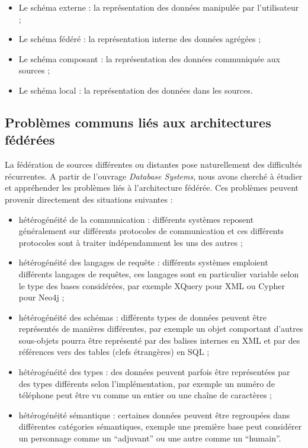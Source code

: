 \begin{itemize}
    \item Le schéma externe : la représentation des données manipulée par l’utilisateur ;

    \item Le schéma fédéré : la représentation interne des données agrégées ;

    \item Le schéma composant : la représentation des données communiquée aux sources ;

    \item Le schéma local : la représentation des données dans les sources.
\end{itemize}

\subsection{Problèmes communs liés aux architectures fédérées}

La fédération de sources différentes ou distantes pose naturellement des difficultés récurrentes. A partir de l’ouvrage \textit{Database Systems}\cite{bib:dbsys}, nous avons cherché à étudier et appréhender les problèmes liés à l’architecture fédérée. Ces problèmes peuvent provenir directement des situations suivantes :

\begin{itemize}
    \item hétérogénéité de la communication : différents systèmes reposent généralement sur différents protocoles de communication et ces différents protocoles sont à traiter indépendamment les uns des autres ;
    \item hétérogénéité des langages de requête : différents systèmes emploient différents langages de requêtes, ces langages sont en particulier variable selon le type des bases considérées, par exemple XQuery pour XML ou Cypher pour Neo4j ;
    \item hétérogénéité des schémas : différents types de données peuvent être représentés de manières différentes, par exemple un objet comportant d’autres sous-objets pourra être représenté par des balises internes en XML et par des références vers des tables (clefs étrangères) en SQL ;
    \item  hétérogénéité des types : des données peuvent parfois être représentées par des types différents selon l’implémentation, par exemple un numéro de téléphone peut être vu comme un entier ou une chaîne de caractères ;
    \item hétérogénéité sémantique : certaines données peuvent être regroupées dans différentes catégories sémantiques, exemple une première base peut considérer un personnage comme un “adjuvant” ou une autre comme un “humain”.
\end{itemize}

